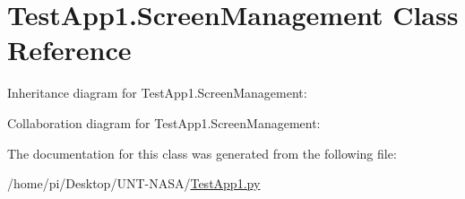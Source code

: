 \hypertarget{classTestApp1_1_1ScreenManagement}{}\section{Test\+App1.\+Screen\+Management Class Reference}
\label{classTestApp1_1_1ScreenManagement}


Inheritance diagram for Test\+App1.\+Screen\+Management\+:


Collaboration diagram for Test\+App1.\+Screen\+Management\+:


The documentation for this class was generated from the following file\+:\begin{DoxyCompactItemize}
\item 
/home/pi/\+Desktop/\+U\+N\+T-\/\+N\+A\+S\+A/\hyperlink{TestApp1_8py}{Test\+App1.\+py}\end{DoxyCompactItemize}
